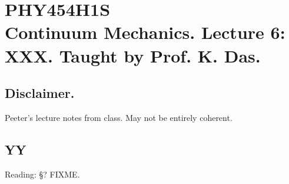 
%

\chapter{PHY454H1S\\Continuum Mechanics.  Lecture 6: XXX.  Taught by Prof. K. Das.}
\label{chap:continuumL6}
{}
\date{Jan 27, 2012}

\beginArtWithToc

\section{Disclaimer.}

Peeter's lecture notes from class.  May not be entirely coherent.

\section{YY}

Reading: \S ? FIXME.

\EndArticle
